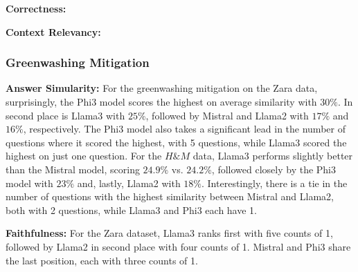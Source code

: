 \documentclass[]{article}
\begin{document}
\textbf{Correctness:}

\textbf{Context Relevancy:}

\subsubsection{Greenwashing Mitigation}
\textbf{Answer Simularity:} For the greenwashing mitigation on the Zara data, surprisingly, the Phi3 model scores the highest on average similarity with $30\%$. In second place is Llama3 with $25\%$, followed by Mistral and Llama2 with $17\%$ and $16\%$, respectively. The Phi3 model also takes a significant lead in the number of questions where it scored the highest, with 5 questions, while Llama3 scored the highest on just one question.\newline  
For the $H\&M$ data, Llama3 performs slightly better than the Mistral model, scoring $24.9\%$ vs. $24.2\%$, followed closely by the Phi3 model with $23\%$ and, lastly, Llama2 with $18\%$.  
Interestingly, there is a tie in the number of questions with the highest similarity between Mistral and Llama2, both with 2 questions, while Llama3 and Phi3 each have 1.

\textbf{Faithfulness:}
For the Zara dataset, Llama3 ranks first with five counts of 1, followed by Llama2 in second place with four counts of 1. Mistral and Phi3 share the last position, each with three counts of 1.  
\end{document}
